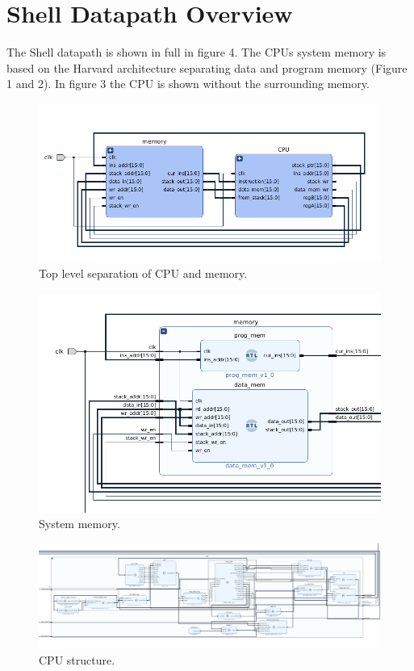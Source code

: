 \documentclass{article}
\begin{document}
\section{Shell Datapath Overview}
\label{overview}
\begin{par}
	The Shell datapath is shown in full in figure 4. The CPUs system memory is based on the Harvard architecture separating data and program memory (Figure 1 and 2). In figure 3 the CPU is shown without the surrounding memory. 
	
	\begin{figure}[H]
		\centering
		\includegraphics[width=5in]{img/system_ov.png}
		\caption{Top level separation of CPU and memory.}
	\end{figure}

		\begin{figure}[H]
		\centering
		\includegraphics[width=6in]{img/sysmem.png}
		\caption{System memory.}
	\end{figure}
	
	\hspace{100pt}
	
	\begin{figure}[H]
		\centering
		\includegraphics[width=7in]{img/cpuov.png}
		\caption{CPU structure.}
	\end{figure}


\end{par}
\end{document}
